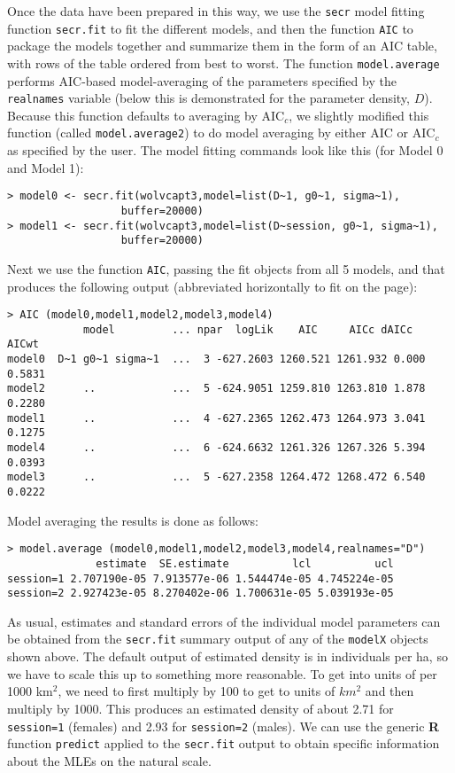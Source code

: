 Once the data have been prepared in this way, we use the
\mbox{\tt secr} model fitting function \mbox{\tt secr.fit} to fit the
different models, and then the function \mbox{\tt AIC} to
package the models together and summarize them in the form of an AIC
table, with rows of the table ordered from best to worst. The function
\mbox{\tt model.average} performs AIC-based model-averaging of the
parameters specified by the \mbox{\tt realnames} variable (below this
is demonstrated for the parameter density, $D$).  Because this
function defaults to averaging by AIC$_c$, we slightly modified
this function (called \mbox{\tt model.average2}) to do model averaging
by either  AIC or AIC$_c$ as specified by the user. The model fitting
commands look like this (for Model 0 and Model 1):
{\small
\begin{verbatim}
> model0 <- secr.fit(wolvcapt3,model=list(D~1, g0~1, sigma~1), 
                  buffer=20000)
> model1 <- secr.fit(wolvcapt3,model=list(D~session, g0~1, sigma~1), 
                  buffer=20000)
\end{verbatim}
}
Next we use the function \mbox{\tt AIC}, passing the fit objects from
all 5 models, and that produces the following output (abbreviated
horizontally to fit on the page):
{\small
\begin{verbatim}
> AIC (model0,model1,model2,model3,model4)
            model         ... npar  logLik    AIC     AICc dAICc  AICwt
model0  D~1 g0~1 sigma~1  ...  3 -627.2603 1260.521 1261.932 0.000 0.5831
model2      ..            ...  5 -624.9051 1259.810 1263.810 1.878 0.2280
model1      ..            ...  4 -627.2365 1262.473 1264.973 3.041 0.1275
model4      ..            ...  6 -624.6632 1261.326 1267.326 5.394 0.0393
model3      ..            ...  5 -627.2358 1264.472 1268.472 6.540 0.0222
\end{verbatim}
}
Model averaging the results is done as follows:
{\small 
\begin{verbatim}
> model.average (model0,model1,model2,model3,model4,realnames="D")
              estimate  SE.estimate          lcl          ucl
session=1 2.707190e-05 7.913577e-06 1.544474e-05 4.745224e-05
session=2 2.927423e-05 8.270402e-06 1.700631e-05 5.039193e-05
\end{verbatim}
}
As usual, estimates and standard errors of the individual model
parameters can be obtained from the \mbox{\tt secr.fit} summary output
of any of the \mbox{\tt modelX} objects shown above.
The default output of estimated density is in individuals per ha, so
we have to scale this up to something more reasonable. To get into
units of per 1000 km$^2$, we need to first multiply by 100 to get to units of
$km^2$ and then multiply by 1000. This produces an estimated density of
about 2.71 for \mbox{\tt session=1} (females) and 2.93 for
\mbox{\tt session=2} (males).  We can use the generic {\bf R} function
\mbox{\tt predict} applied to the \mbox{\tt secr.fit} output to obtain
 specific information about the MLEs on the natural scale.

